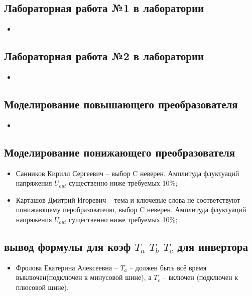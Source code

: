 \documentclass[a4paper,landscape,11pt]{article}
\begin{document}
\subsection{Лабораторная работа №1 в лаборатории }
\begin{itemize}
\item
\end{itemize}

\subsection{Лабораторная работа №2 в лаборатории }
\begin{itemize}
\item
\end{itemize}

\subsection{Моделирование повышающего преобразователя}
\begin{itemize}
\item 
\end{itemize}

\subsection{Моделирование понижающего преобразователя}
\begin{itemize}
\item Санников Кирилл Сергеевич -- выбор C неверен. Амплитуда флуктуаций напряжения $U_{out}$ существенно ниже требуемых 10\%;
\item Карташов Дмитрий Игоревич -- тема и ключевые слова не соответствуют понижающему перобразователю, выбор C неверен. Амплитуда флуктуаций напряжения $U_{out}$ существенно ниже требуемых 10\%;
\end{itemize}

\subsection{вывод формулы для коэф $T_a$ $T_b$ $T_c$ для инвертора}
\begin{itemize}
\item Фролова Екатерина Алексеевна -- $T_a$ -- должен быть всё время выключен(подключен к минусовой шине), а $T_c$ -- включен (подключен к плюсовой шине).
\end{itemize}
\end{document}
